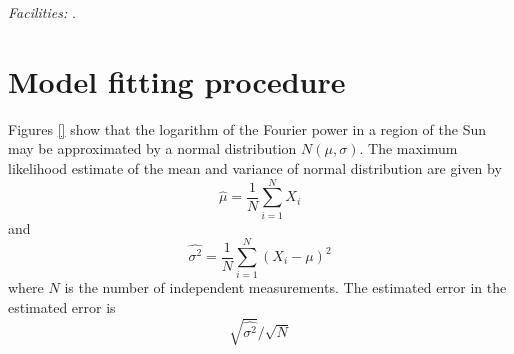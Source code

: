 \documentclass[preprint]{../aastex52/aastex}
\begin{document}

{\it Facilities:} .



\appendix

\section{Model fitting procedure}\label{sec:app:ind}



Figures \ref{} show that the logarithm of the Fourier power in a
region of the Sun may be approximated by a normal distribution $N(\mu,
\sigma)$.  The
maximum likelihood estimate of the mean and variance of normal
distribution are given by
\begin{equation}
\hat{\mu} = \frac{1}{N}\sum_{i=1}^{N}X_{i}
\label{eqn:mlmean}
\end{equation}
and
\begin{equation}
\hat{\sigma^{2}} = \frac{1}{N}\sum_{i=1}^{N}(X_{i}-\mu)^{2}
\label{eqn:mlmean}
\end{equation}
where $N$ is the number of independent measurements.  The estimated
error in the estimated error is
\begin{equation}
\sqrt{\hat{\sigma^{2}}}/\sqrt{N}
\label{eqn:mlmean}
\end{equation}
\end{document}
